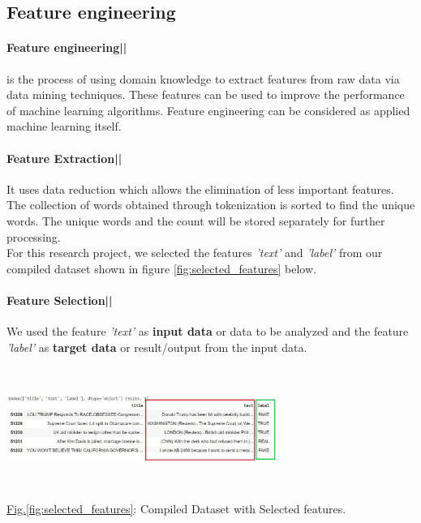 \documentclass[11.5pt]{article}
\begin{document}
\begin{multicols}{2}
\subsection{Feature engineering}
\paragraph{Feature engineering||}
is the process of using domain knowledge to extract features from raw data via data mining techniques. These features can be used to improve the performance of machine learning algorithms. Feature engineering can be considered as applied machine learning itself.
\paragraph{Feature Extraction||}
It uses data reduction which allows the elimination of less important features. The collection of words obtained through tokenization is sorted to find the unique words. The unique words and the count will be stored separately for further processing.\\
For this research project, we selected the features \textit{'text'} and \textit{'label'} from our compiled dataset shown in figure \ref{fig:selected_features} below.
\paragraph{Feature Selection||}
We used the feature \textit{'text'} as \textbf{input data} or data to be analyzed and the feature \textit{'label'} as \textbf{target data} or result/output from the input data.
\begin{center}
    \centering
    \qquad
    \includegraphics[width=8.8cm, height=3.9cm]{compiled dataset with selected features.jpg}
    \caption{\underline{Fig.\ref{fig:selected_features}}: Compiled Dataset with Selected features.}
    \label{fig:selected_features}
\end{center}

\end{multicols}
\end{document}
